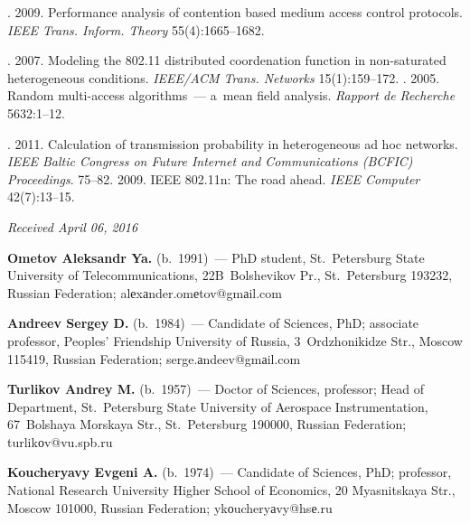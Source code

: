 \begin{multicols}{2}
{{\begin{thebibliography}{99}
. 2009. Performance 
analysis of contention based medium access control protocols. \textit{IEEE 
Trans. Inform. Theory} 55(4):1665--1682.

\pagebreak

. 2007. Modeling the 802.11 
distributed coordenation function in non-saturated heterogeneous conditions.  
\textit{IEEE/ACM Trans. Networks} 15(1):159--172.
. 2005. Random  
multi-access algorithms~--- a~mean field analysis. \textit{Rapport de 
Recherche}  5632:1--12.


. 2011. Calculation of 
transmission probability in heterogeneous ad hoc networks. \textit{IEEE Baltic 
Congress on Future Internet and Communications (BCFIC) Proceedings}.  
75--82.
 2009. IEEE 802.11n: The road ahead. \textit{IEEE 
Computer} 42(7):13--15.
\end{thebibliography}

 }
 }

\end{multicols}

\vspace*{-3pt}

\hfill{\small\textit{Received April 06, 2016}}

\Contr

\noindent
\textbf{Ometov Aleksandr Ya.} (b.\ 1991)~--- PhD student, St.\ Petersburg State University 
of Telecommunications, 22B~Bolshevikov Pr., St.\ Petersburg 193232, Russian Federation; 
\mbox{alеxаnder.omеtov@gmаil.com}

\vspace*{4pt}

\noindent
\textbf{Andreev Sergey D.} (b.\ 1984)~--- Candidate of Sciences, PhD; associate professor, 
Peoples' Friendship University of Russia, 3~Ordzhonikidze Str., Moscow 115419, Russian 
Federation; \mbox{serge.аndeev@gmаil.com}

\vspace*{4pt}

\noindent
\textbf{Turlikov Andrey M.} (b.\ 1957)~--- Doctor of Sciences, professor; Head of 
Department, St.\ Petersburg State University of Aerospace Instrumentation, 67~Bolshaya 
Morskaya Str., St.\ Petersburg 190000, Russian Federation; \mbox{turlikоv@vu.spb.ru}

\vspace*{4pt}

\noindent
\textbf{Koucheryavy Evgeni A.} (b.\ 1974)~--- Candidate of Sciences, PhD; professor, 
National Research University Higher School of Economics, 20 Myasnitskaya Str., Moscow 
101000, Russian Federation; \mbox{ykоucheryаvy@hsе.ru}

\label{end\stat}


\renewcommand{\bibname}{\protect\rm Литература}
     